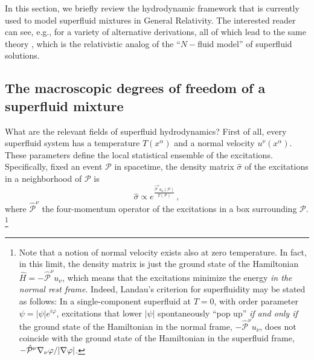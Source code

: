 \documentclass[a4paper, amsfonts, amssymb, amsmath, reprint, showkeys, nofootinbib, twoside,notitlepage,onecolumn]{revtex4-2}
\theoremstyle{definition}
\theoremstyle{theorem}
\theoremstyle{corollary}
\begin{document}
In this section, we briefly review the hydrodynamic framework that is currently used to model superfluid mixtures in General Relativity. The interested reader can see, e.g., \cite{Carter_starting_point,carter92,cool1995,langlois98,Son2001,GusakovAndersson2006,Gusakov2007,Gusakov:2016eom,Herzog2009,Jensen:2012jh,GavassinoKhalatnikov2022,GavassinoStabilityCarter2022} for a variety of alternative derivations, all of which lead to the same theory \cite{Termo}, which is the relativistic analog of the \citet{AndreevBash1975} ``$N-$fluid model'' of superfluid solutions.

\vspace{-0.2cm}
\subsection{The macroscopic degrees of freedom of a superfluid mixture}
\vspace{-0.2cm}

What are the relevant fields of superfluid hydrodynamics? First of all, every superfluid system has a temperature $T(x^\alpha)$ and a normal velocity $u^\nu(x^\alpha)$. These parameters define the local statistical ensemble of the excitations. Specifically, fixed an event $\mathscr{P}$ in spacetime, the density matrix $\hat{\sigma}$ of the excitations in a neighborhood of $\mathscr{P}$ is \cite{cool1995,GavassinoKhalatnikov2022}
\begin{equation}\label{densitymatrix}
\hat{\sigma}\propto e^{\frac{\hat{\mathcal{P}}^\nu u_\nu(\mathscr{P})}{T(\mathscr{P})}} \, ,
\end{equation}
where $\hat{\mathcal{P}}^\nu$ the four-momentum operator of the excitations in a box surrounding $\mathscr{P}.$\footnote{\label{footnoteonunu}Note that a notion of normal velocity exists also at zero temperature. In fact, in this limit, the density matrix is just the ground state of the Hamiltonian $\hat{H}=- \hat{\mathcal{P}}^\nu u_\nu$, which means that the excitations minimize the energy \textit{in the normal rest frame}. Indeed, Landau's criterion for superfluidity \cite[\S 22]{landau9} may be stated as follows: In a single-component superfluid at $T=0$, with order parameter $\psi=|\psi| e^{i\varphi}$, excitations that lower $|\psi|$ spontaneously ``pop up'' \textit{if and only if} the ground state of the Hamiltonian in the normal frame, $- \hat{\mathcal{P}}^\nu u_\nu$, does not coincide with the ground state of the Hamiltonian in the superfluid frame, $- \Hat{\mathcal{P}}^\nu \nabla_\nu \varphi /|\nabla \varphi|$.} 
\end{document}
